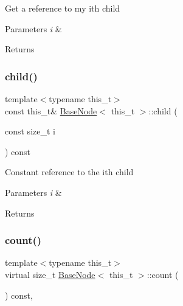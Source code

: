 Get a reference to my i\textquotesingle{}th child 
\begin{DoxyParams}{Parameters}
{\em i} & \\
\hline
\end{DoxyParams}
\begin{DoxyReturn}{Returns}

\end{DoxyReturn}
\mbox{\label{class_base_node_a2e244ddbbc0edea5f648e2a900e9dd99}} 
\subsubsection{\texorpdfstring{child()}{child()}\hspace{0.1cm}{\footnotesize\ttfamily [2/2]}}
{\footnotesize\ttfamily template$<$typename this\+\_\+t$>$ \\
const this\+\_\+t\& \hyperlink{class_base_node}{Base\+Node}$<$ this\+\_\+t $>$\+::child (\begin{DoxyParamCaption}\item[{const size\+\_\+t}]{i }\end{DoxyParamCaption}) const\hspace{0.3cm}{\ttfamily [inline]}}

Constant reference to the i\textquotesingle{}th child 
\begin{DoxyParams}{Parameters}
{\em i} & \\
\hline
\end{DoxyParams}
\begin{DoxyReturn}{Returns}

\end{DoxyReturn}
\mbox{\label{class_base_node_a4007d1c72991b8599a6ff5a21c054ba5}} 
\subsubsection{\texorpdfstring{count()}{count()}\hspace{0.1cm}{\footnotesize\ttfamily [1/2]}}
{\footnotesize\ttfamily template$<$typename this\+\_\+t$>$ \\
virtual size\+\_\+t \hyperlink{class_base_node}{Base\+Node}$<$ this\+\_\+t $>$\+::count (\begin{DoxyParamCaption}{ }\end{DoxyParamCaption}) const\hspace{0.3cm}{\ttfamily [inline]}, {\ttfamily [virtual]}}

